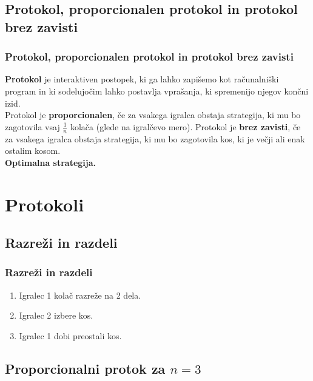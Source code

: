 \documentclass{beamer}
\begin{document}
	\subsection{Protokol, proporcionalen protokol in protokol brez zavisti}
	
	\begin{frame}
		\frametitle{Protokol, proporcionalen protokol in protokol brez zavisti}
			\textbf{Protokol} je interaktiven postopek, ki ga lahko zapišemo kot računalniški program in ki sodelujočim lahko postavlja vprašanja, ki spremenijo njegov končni izid. \\\vspace{9pt}
			\pause
			Protokol je \textbf{proporcionalen}, če za vsakega igralca obstaja strategija, ki mu bo zagotovila vsaj $\frac{1}{n}$ kolača (glede na igralčevo mero). Protokol je \textbf{brez zavisti}, če za vsakega igralca obstaja strategija, ki mu bo zagotovila kos, ki je večji ali enak ostalim kosom.	\\\vspace{9pt}
			\pause
			\textbf{Optimalna strategija.}
	\end{frame}

	\section{Protokoli}
	
	\subsection{Razreži in razdeli}
	
	\begin{frame}
		\frametitle{Razreži in razdeli}
		\begin{enumerate}
			\item Igralec 1 kolač razreže na 2 dela.
			
			\item Igralec 2 izbere kos.
			
			\item Igralec 1 dobi preostali kos.
		\end{enumerate}
	\end{frame}

	\subsection{Proporcionalni protok za $n = 3$}
	
\end{document}
